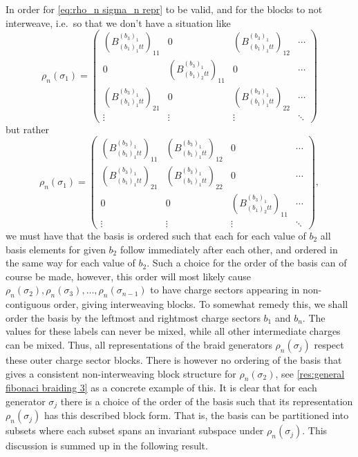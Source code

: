 \documentclass[a4paper,10pt,oneside]{book}
\theoremstyle{plain}
\theoremstyle{definition}
\theoremstyle{remark}
\begin{document}
In order for \cref{eq:rho_n sigma_n repr} to be valid, and for the blocks to not interweave, i.e.\ so that we don't have a situation like
\begin{equation}
  ρ_n(σ_1) =
  \begin{pmatrix}
    \left(B_{(b_1)_1 t t}^{(b_3)_1}\right)_{11} & 0 & \left(B_{(b_1)_1 t t}^{(b_3)_1}\right)_{12} & \cdots \\
    0 & \left(B_{(b_1)_2 t t}^{(b_3)_1}\right)_{11} & 0 & \cdots \\
    \left(B_{(b_1)_1 t t}^{(b_3)_1}\right)_{21} & 0 & \left(B_{(b_1)_1 t t}^{(b_3)_1}\right)_{22} & \cdots \\
    \vdots & \vdots & \vdots & \ddots
  \end{pmatrix}
\end{equation}
but rather
\begin{equation}
  ρ_n(σ_1) =
  \begin{pmatrix}
    \left(B_{(b_1)_1 t t}^{(b_3)_1}\right)_{11} & \left(B_{(b_1)_1 t t}^{(b_3)_1}\right)_{12} & 0 & \cdots \\
    \left(B_{(b_1)_1 t t}^{(b_3)_1}\right)_{21} & \left(B_{(b_1)_1 t t}^{(b_3)_1}\right)_{22} & 0 & \cdots \\
    0 & 0 & \left(B_{(b_1)_2 t t}^{(b_3)_1}\right)_{11} & \cdots \\
    \vdots & \vdots & \vdots & \ddots
  \end{pmatrix},
\end{equation}
we must have that the basis is ordered such that each for each value of $b_2$ all basis elements for given $b_2$ follow immediately after each other, and ordered in the same way for each value of $b_2$. Such a choice for the order of the basis can of course be made, however, this order will most likely cause $ρ_n(σ_2), ρ_n(σ_3), \dots, ρ_n(σ_{n-1})$ to have charge sectors appearing in non-contiguous order, giving interweaving blocks. To somewhat remedy this, we shall order the basis by the leftmost and rightmost charge sectors $b_1$ and $b_n$. The values for these labels can never be mixed, while all other intermediate charges can be mixed. Thus, all representations of the braid generators $ρ_n(σ_j)$ respect these outer charge sector blocks. There is however no ordering of the basis that gives a consistent non-interweaving block structure for $ρ_n(σ_2)$, see \cref{res:general fibonaci braiding 3} as a concrete example of this. It is clear that for each generator $σ_j$ there is a choice of the order of the basis such that its representation $ρ_n(σ_j)$ has this described block form. That is, the basis can be partitioned into subsets where each subset spans an invariant subspace under $ρ_n(σ_j)$. This discussion is summed up in the following result.
\end{document}
